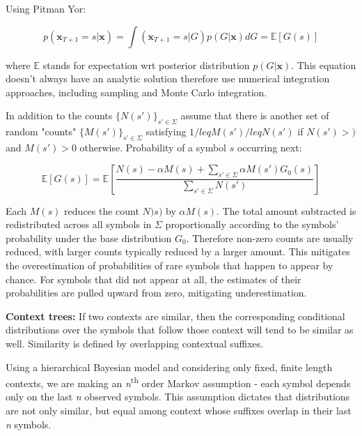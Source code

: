 Using Pitman Yor:

\begin{equation}
p(\boldsymbol{x}_{T+1}=s|\boldsymbol{x})=\int(\boldsymbol{x}_{T+1}=s | G)p(G|\boldsymbol{x})dG={\mathbb E} [G(s)]
\label{eq:seqMemPowerLaw}
\end{equation}

\noindent where $\mathbb E$ stands for expectation wrt posterior distribution $p(G|\boldsymbol{x})$. This equation doesn't always have an analytic solution therefore use numerical integration approaches, including sampling and Monte Carlo integration. 

In addition to the counts $\{N(s')\}_{s' \in \Sigma}$ assume that there is another set of random "counts" $\{M(s')\}_{s' \in \Sigma}$ satisfying $1/leq M(s') /leq N(s')$ if $N(s') >)$ and $M(s')>0$ otherwise. Probability of a symbol $s$ occurring next:

\begin{equation}
\mathbb E [G(s)]=\mathbb E \left [\frac {N(s)-\alpha M(s)+\sum_{s' \in \Sigma}\alpha M(s')G_{0}(s)}{\sum_{s' \in \Sigma}N(s')}\right ]
\label{eq:seqMemPYP}
\end{equation}

\noindent Each $M(s)$ reduces the count $N)s)$ by $\alpha M(s)$. The total amount subtracted is redistributed across all symbols in $\Sigma$ proportionally according to the symbols' probability under the base distribution $G_{0}$. Therefore non-zero counts are usually reduced, with larger counts typically reduced by a larger amount. This mitigates the overestimation of probabilities of rare symbols that happen to appear by chance. For symbols that did not appear at all, the estimates of their probabilities are pulled upward from zero, mitigating underestimation.

\textbf{Context trees:} If two contexts are similar, then the corresponding conditional distributions over the symbols that follow those context will tend to be similar as well. Similarity is defined by overlapping contextual suffixes.

Using a hierarchical Bayesian model and considering only fixed, finite length contexts, we are making an \textit{n}\textsuperscript{th} order Markov assumption - each symbol depends only on the last \textit{n} observed symbols. This assumption dictates that distributions are not only similar, but equal among context whose suffixes overlap in their last \textit{n} symbols.

